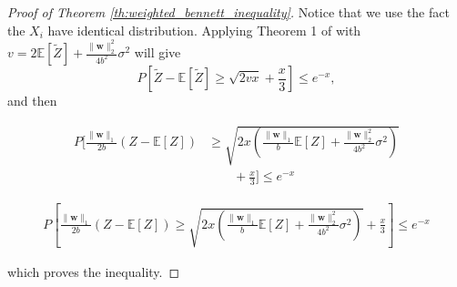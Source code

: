\documentclass[letterpaper]{article} %
\def\DoubleColumn{}
\def\DoubleColumnEnd{}
\def\SingleColumn{}
\def\SingleColumnEnd{}
\newtheorem{lemma}{Lemma}
\newcommand{\E}{\mathbb{E}}
\newcommand{\Pro}{P}
\newcommand{\weight}{\mathbf{w}}
\newcommand{\normo}[1]{\|#1\|_1}
\newcommand{\citep}[3]{(#1\ \citeauthor{#3}\ \citeyear{#3},\ #2)}
\begin{document}
\begin{proof}[Proof of Theorem \ref{th:weighted_bennett_inequality}]
    Notice that we use the fact the $X_i$ have identical distribution.
    Applying Theorem 1 of \cite{Bousquet2002a} with $v=2\E[\widetilde{Z}]+\frac{\|\weight{}\|_2^2}{4b^2}\sigma^2$ will give
    \[\Pro[\widetilde{Z}-\E[\widetilde{Z}]\ge \sqrt{2vx}+\frac{x}{3}]\le e^{-x},\]
    and then
    \DoubleColumn
    \begin{align*}
        \Pro[\frac{\normo{\weight{}}}{2b}(Z-\E[Z])&\ge \sqrt{2x(\frac{\normo{\weight{}}}{b}\E[Z]+\frac{\|\weight{}\|_2^2}{4b^2}\sigma^2)}\\
        &\qquad+\frac{x}{3}] \le e^{-x}
    \end{align*}
    \DoubleColumnEnd
    \SingleColumn
    \begin{align*}
        \Pro\left[\frac{\normo{\weight{}}}{2b}(Z-\E[Z])\ge \sqrt{2x(\frac{\normo{\weight{}}}{b}\E[Z]+\frac{\|\weight{}\|_2^2}{4b^2}\sigma^2)}+\frac{x}{3}\right] \le e^{-x}
    \end{align*}
    \SingleColumnEnd
    which proves the inequality.
\end{proof}
\end{document}
